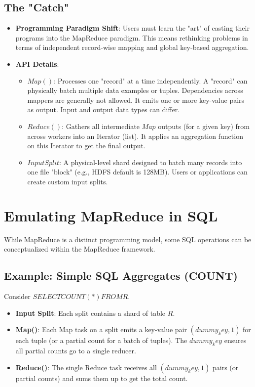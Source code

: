 \documentclass{article}
\begin{document}
\subsection*{The "Catch"}
\begin{itemize}
    \item \textbf{Programming Paradigm Shift}: Users must learn the "art" of casting their programs into the MapReduce paradigm. This means rethinking problems in terms of independent record-wise mapping and global key-based aggregation.
    \item \textbf{API Details}:
    \begin{itemize}
        \item $Map()$: Processes one "record" at a time independently. A "record" can physically batch multiple data examples or tuples. Dependencies across mappers are generally not allowed. It emits one or more key-value pairs as output. Input and output data types can differ.
        \item $Reduce()$: Gathers all intermediate $Map$ outputs (for a given key) from across workers into an Iterator (list). It applies an aggregation function on this Iterator to get the final output.
        \item $Input Split$: A physical-level shard designed to batch many records into one file "block" (e.g., HDFS default is 128MB). Users or applications can create custom input splits.
    \end{itemize}
\end{itemize}

\section*{Emulating MapReduce in SQL}
While MapReduce is a distinct programming model, some SQL operations can be conceptualized within the MapReduce framework.

\subsection*{Example: Simple SQL Aggregates (COUNT)}
Consider $SELECT COUNT(*) FROM R$.
\begin{itemize}
    \item \textbf{Input Split}: Each split contains a shard of table $R$.
    \item \textbf{Map()}: Each Map task on a split emits a key-value pair $(dummy_key, 1)$ for each tuple (or a partial count for a batch of tuples). The $dummy_key$ ensures all partial counts go to a single reducer.
    \item \textbf{Reduce()}: The single Reduce task receives all $(dummy_key, 1)$ pairs (or partial counts) and sums them up to get the total count.
\end{itemize}
\end{document}
